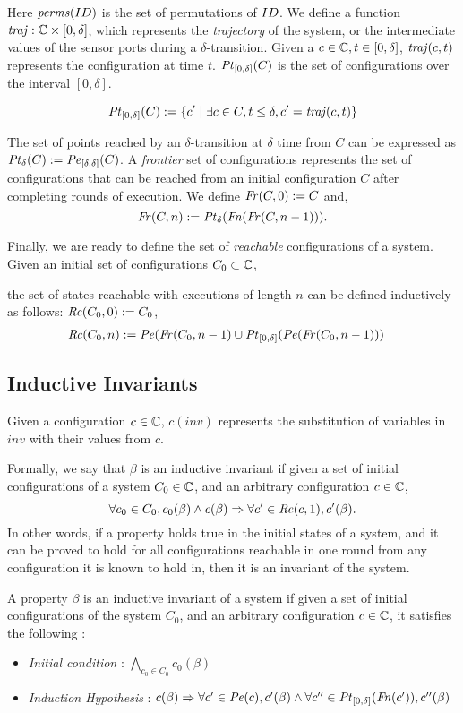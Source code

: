 Here $\mathit{perms}(ID)$ is the set of permutations of $ID$.
We define a function $\mathit{traj}: \mathbb{C} \times \left[0,\delta\right]$, which represents the \emph{trajectory} of the system, or the intermediate values of the sensor ports during a $\delta$-transition. Given a $c\in \mathbb{C}, t\in \left[0,\delta\right]$, $\mathit{traj}(c,t)$ represents the configuration at time $t$. $\mathit{Pt}_{[0,\delta]}(C)$ is  the set of configurations over the interval $[0,\delta]$.

$$\mathit{Pt}_{[0,\delta]}(C) := \left\{c^\prime \mid \exists c\in C, t\leq \delta , c^\prime = \mathit{traj}(c,t)\right\}$$

The set of points reached by an $\delta$-transition at $\delta$ time from $C$ can be expressed as $\mathit{Pt}_\delta(C) := \mathit{Pe}_{[\delta,\delta]}(C)$. A \emph{frontier} set of configurations represents the set of configurations that can be reached from an initial configuration $C$ after completing rounds of execution. We define $\mathit{Fr}(C,0) := C$ and,
$$\mathit{Fr}(C,n) := \mathit{Pt}_\delta(\mathit{Fn}(\mathit{Fr}(C,n-1))).$$

Finally, we are ready to define the set of \emph{reachable} configurations of a system. Given an initial set of configurations $C_0\subset\mathbb{C}$,

the set of states reachable with executions of length $n$ can be defined inductively as follows: $\mathit{Rc}(C_0,0) := C_0$,
\begin{align*}
\mathit{Rc}(C_0,n) &:= \mathit{Pe}(\mathit{Fr}(C_0,n-1) \cup \mathit{Pt}_{[0,\delta]}(\mathit{Pe}(\mathit{Fr}(C_0,n-1)))
\end{align*}


\subsection{Inductive Invariants}
Given a configuration $c \in \mathbb{C}$, $c(\mathit{inv})$ represents the substitution of variables in $\mathit{inv}$ with their values from $c$.

 Formally, we say that $\beta$ is an inductive invariant if given a set of initial configurations of a system $C_0 \in \mathbb{C}$, and an arbitrary configuration $c \in \mathbb{C}$,  $$\forall c_0 \in C_0, c_0(\beta) \wedge c(\beta) \Rightarrow \forall c^\prime \in \mathit{Rc}(c,1), c^\prime(\beta).$$ In other words, if a property holds true in the initial states of a system, and it can be proved to hold for all configurations reachable in one round from any configuration it is known to hold in, then it is an invariant of the system.


\begin{definition}
\label{def:ii}
A property $\beta$ is an inductive invariant of a system if given a set of initial configurations of the system $C_0$, and an arbitrary configuration $c\in \mathbb{C}$, it satisfies the following :
\begin{itemize}
    \item \emph{Initial condition} : $\bigwedge_{c_0\in C_0}c_0(\beta) $
\item  \emph{Induction Hypothesis} : $c(\beta) \Rightarrow \forall c' \in \mathit{Pe}(c), c'(\beta) \wedge \forall c'' \in \mathit{Pt}_{[0,\delta]}(\mathit{Fn}(c')) , c''(\beta)$
\end{itemize}
\end{definition}

